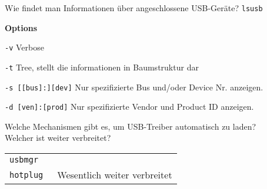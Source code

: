 \begin{flashcard}[Command]{Wie findet man Informationen über angeschlossene USB-Geräte?}
	\texttt{lsusb}
	
	\begin{description}
		\item \textbf{Options}
		
		\begin{description}
			\item \texttt{-v} Verbose
			
			\item \texttt{-t} Tree, stellt die informationen in Baumstruktur dar
			
			\item \texttt{-s [[bus]:][dev]} Nur spezifizierte Bus und/oder Device Nr. anzeigen.
			
			\item \texttt{-d [ven]:[prod]} Nur spezifizierte Vendor und Product ID anzeigen.
		\end{description}
	\end{description}
	
	
\end{flashcard}

\begin{flashcard}[Daemon]{Welche Mechanismen gibt es, um USB-Treiber automatisch zu laden?\\Welcher ist weiter verbreitet?}	
	\begin{tabular}{ll}
	\texttt{usbmgr} 	& \\
	\texttt{hotplug} 	& \textleftarrow\ Wesentlich weiter verbreitet\\
	\end{tabular}
\end{flashcard}


\begin{flashcard}[TO DO]{}	
\end{flashcard}
